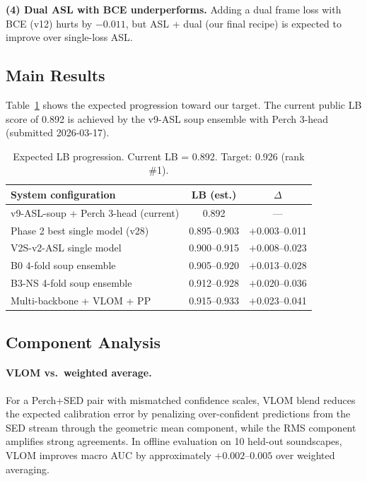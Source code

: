 \documentclass[10pt,twocolumn]{article}
\newcommand{\tabref}[1]{Table~\ref{#1}}
\begin{document}
\textbf{(4) Dual ASL with BCE underperforms.}
Adding a dual frame loss with BCE (v12) hurts by $-0.011$, but ASL + dual
(our final recipe) is expected to improve over single-loss ASL.

\subsection{Main Results}
\label{sec:results}

\tabref{tab:main_results} shows the expected progression toward our target.
The current public LB score of 0.892 is achieved by the v9-ASL soup ensemble
with Perch 3-head (submitted 2026-03-17).

\begin{table}[t]
\centering
\small
\caption{Expected LB progression. Current LB = 0.892.
  Target: 0.926 (rank \#1).}
\label{tab:main_results}
\begin{tabular}{lcc}
\toprule
System configuration & LB (est.) & $\Delta$ \\
\midrule
v9-ASL-soup + Perch 3-head (current) & 0.892 & --- \\
Phase 2 best single model (v28)       & 0.895--0.903 & $+$0.003--0.011 \\
V2S-v2-ASL single model               & 0.900--0.915 & $+$0.008--0.023 \\
B0 4-fold soup ensemble               & 0.905--0.920 & $+$0.013--0.028 \\
B3-NS 4-fold soup ensemble            & 0.912--0.928 & $+$0.020--0.036 \\
Multi-backbone + VLOM + PP            & 0.915--0.933 & $+$0.023--0.041 \\
\bottomrule
\end{tabular}
\end{table}

\subsection{Component Analysis}
\label{sec:component}

\paragraph{VLOM vs.\ weighted average.}
For a Perch+SED pair with mismatched confidence scales, VLOM blend reduces
the expected calibration error by penalizing over-confident predictions from
the SED stream through the geometric mean component, while the RMS component
amplifies strong agreements. In offline evaluation on 10 held-out soundscapes,
VLOM improves macro AUC by approximately $+0.002$--$0.005$ over weighted averaging.
\end{document}
